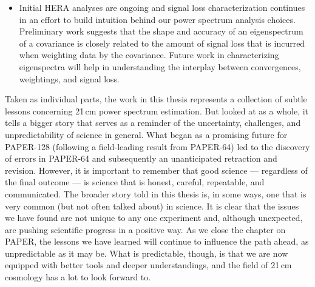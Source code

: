 \begin{itemize}
\item Initial HERA analyses are ongoing and signal loss characterization continues in an effort to build intuition behind our power spectrum analysis choices. Preliminary work suggests that the shape and accuracy of an eigenspectrum of a covariance is closely related to the amount of signal loss that is incurred when weighting data by the covariance. Future work in characterizing eigenspectra will help in understanding the interplay between convergences, weightings, and signal loss.
\end{itemize}

Taken as individual parts, the work in this thesis represents a collection of subtle lessons concerning 21\,cm power spectrum estimation. But looked at as a whole, it tells a bigger story that serves as a reminder of the uncertainty, challenges, and unpredictability of science in general. What began as a promising future for PAPER-128 (following a field-leading result from PAPER-64) led to the discovery of errors in PAPER-64 and subsequently an unanticipated retraction and revision. However, it is important to remember that good science --- regardless of the final outcome --- is science that is honest, careful, repeatable, and communicated. The broader story told in this thesis is, in some ways, one that is very common (but not often talked about) in science. It is clear that the issues we have found are not unique to any one experiment and, although unexpected, are pushing scientific progress in a positive way. As we close the chapter on PAPER, the lessons we have learned will continue to influence the path ahead, as unpredictable as it may be. What is predictable, though, is that we are now equipped with better tools and deeper understandings, and the field of 21\,cm cosmology has a lot to look forward to. 





